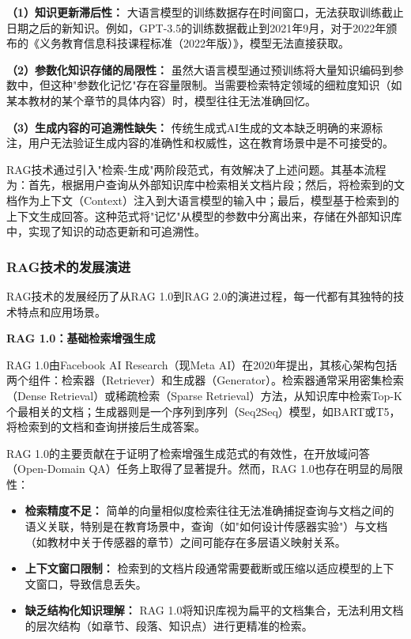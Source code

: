 \documentclass[12pt,a4paper,fontset=fandol]{ctexart}
\begin{document}
\textbf{（1）知识更新滞后性：} 大语言模型的训练数据存在时间窗口，无法获取训练截止日期之后的新知识。例如，GPT-3.5的训练数据截止到2021年9月，对于2022年颁布的《义务教育信息科技课程标准（2022年版）》，模型无法直接获取。

\textbf{（2）参数化知识存储的局限性：} 虽然大语言模型通过预训练将大量知识编码到参数中，但这种"参数化记忆"存在容量限制。当需要检索特定领域的细粒度知识（如某本教材的某个章节的具体内容）时，模型往往无法准确回忆。

\textbf{（3）生成内容的可追溯性缺失：} 传统生成式AI生成的文本缺乏明确的来源标注，用户无法验证生成内容的准确性和权威性，这在教育场景中是不可接受的。

RAG技术通过引入"检索-生成"两阶段范式，有效解决了上述问题。其基本流程为：首先，根据用户查询从外部知识库中检索相关文档片段；然后，将检索到的文档作为上下文（Context）注入到大语言模型的输入中；最后，模型基于检索到的上下文生成回答。这种范式将"记忆"从模型的参数中分离出来，存储在外部知识库中，实现了知识的动态更新和可追溯性。

\subsubsection{RAG技术的发展演进}
RAG技术的发展经历了从RAG 1.0到RAG 2.0的演进过程，每一代都有其独特的技术特点和应用场景。

\textbf{RAG 1.0：基础检索增强生成}

RAG 1.0由Facebook AI Research（现Meta AI）在2020年提出\cite{rag}，其核心架构包括两个组件：检索器（Retriever）和生成器（Generator）。检索器通常采用密集检索（Dense Retrieval）或稀疏检索（Sparse Retrieval）方法，从知识库中检索Top-K个最相关的文档；生成器则是一个序列到序列（Seq2Seq）模型，如BART或T5，将检索到的文档和查询拼接后生成答案。

RAG 1.0的主要贡献在于证明了检索增强生成范式的有效性，在开放域问答（Open-Domain QA）任务上取得了显著提升。然而，RAG 1.0也存在明显的局限性：

\begin{itemize}
    \item \textbf{检索精度不足：} 简单的向量相似度检索往往无法准确捕捉查询与文档之间的语义关联，特别是在教育场景中，查询（如"如何设计传感器实验"）与文档（如教材中关于传感器的章节）之间可能存在多层语义映射关系。
    \item \textbf{上下文窗口限制：} 检索到的文档片段通常需要截断或压缩以适应模型的上下文窗口，导致信息丢失。
    \item \textbf{缺乏结构化知识理解：} RAG 1.0将知识库视为扁平的文档集合，无法利用文档的层次结构（如章节、段落、知识点）进行更精准的检索。
\end{itemize}
\end{document}
